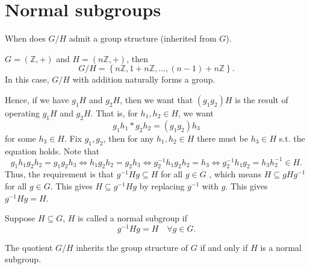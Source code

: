 \section{Normal subgroups}
\begin{question}
    When does \(G / H\) admit a group structure (inherited from \(G\)).
\end{question}

\begin{eg}
    \(G = (\mathbb{Z} , +)\) and \(H = (n\mathbb{Z} , +)\), then 
    \[
        G / H = \left\{ n\mathbb{Z} , 1 + n\mathbb{Z} , \dots , (n - 1) + n\mathbb{Z}  \right\}. 
    \]  
    In this case, \(G / H\) with addition naturally forms a group. 
\end{eg}

Hence, if we have \(g_1 H\) and \(g_2 H\), then we want that \((g_1 g_2) H\) is the result of operating \(g_1 H\) and \(g_2 H\). That is, for \(h_1, h_2 \in H\), we want 
\[
    g_1 h_1 * g_2 h_2 = (g_1 g_2) h_3
\] for some \(h_3 \in H\). Fix \(g_1, g_2\), then for any \(h_1, h_2 \in H\) there must be  \(h_3 \in H\) s.t. the equation holds. Note that 
\[
    g_1 h_1 g_2 h_2 = g_1 g_2 h_3 \iff  h_1 g_2 h_2 = g_2 h_3 \iff  g_2^{-1} h_1 g_2 h_2 = h_3 \iff g_2^{-1} h_1 g_2 = h_3 h_2^{-1} \in H.
\] Thus, the requirement is that \(g^{-1} H g \subseteq H\) for all \(g \in G\) , which means \(H \subseteq gHg^{-1} \) for all \(g \in G\). This gives \(H \subseteq g^{-1} H g\) by replacing \(g^{-1} \) with \(g\). This gives \(g^{-1} H g = H\). 

\begin{definition}
    Suppose \(H \subseteq G\), \(H\) is called a normal subgroup if 
    \[
        g^{-1} H g = H \quad \forall g \in G.
    \]
\end{definition}

\begin{theorem} \label{thm: G/H group iff H nomral}
    The quotient \(G / H\) inherits the group structure of \(G\) if and only if \(H\) is a normal subgroup.   
\end{theorem}